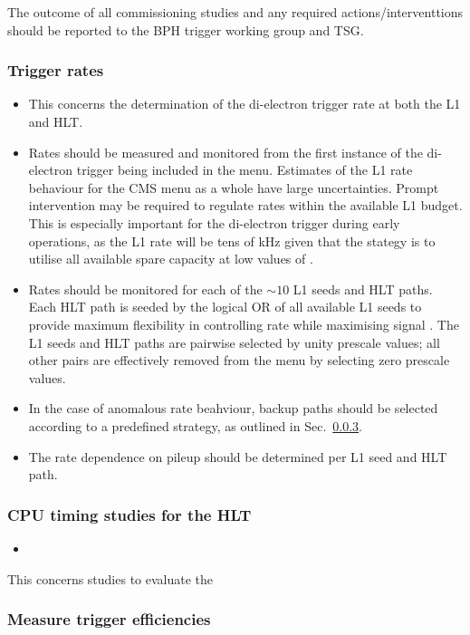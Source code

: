 The outcome of all commissioning studies and any required
actions/interventtions should be reported to the BPH trigger working
group and TSG.

\subsubsection{Trigger rates} 

\begin{itemize}
\item This concerns the determination of the di-electron trigger rate
  at both the L1 and HLT.
\item Rates should be measured and monitored from the first instance
  of the di-electron trigger being included in the menu. Estimates of
  the L1 rate behaviour for the CMS menu as a whole have large
  uncertainties. Prompt intervention may be required to regulate rates
  within the available L1 budget. This is especially important for the
  di-electron trigger during early operations, as the L1 rate will be
  tens of kHz given that the stategy is to utilise all available spare
  capacity at low values of \linst.
\item Rates should be monitored for each of the ${\sim}10$ L1 seeds
  and HLT paths. Each HLT path is seeded by the logical OR of all
  available L1 seeds to provide maximum flexibility in controlling
  rate while maximising signal \axe. The L1 seeds and HLT paths are
  pairwise selected by unity prescale values; all other pairs are
  effectively removed from the menu by selecting zero prescale
  values. 
\item In the case of anomalous rate beahviour, backup paths should be
  selected according to a predefined strategy, as outlined in
  Sec.~\ref{}.
\item The rate dependence on pileup should be determined per L1 seed
  and HLT path.
\end{itemize}

\subsubsection{CPU timing studies for the HLT}

\begin{itemize}
\item 
\end{itemize}

This concerns studies to evaluate the

\subsubsection{Measure trigger efficiencies}

